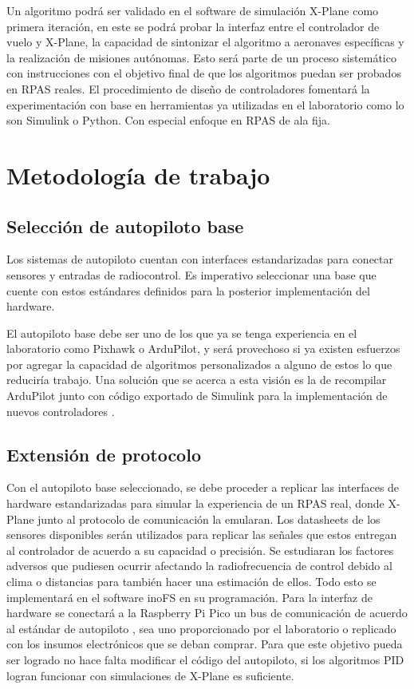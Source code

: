 Un algoritmo podrá ser validado en el software de simulación X-Plane como primera iteración, en este se podrá probar la interfaz entre el controlador de vuelo y X-Plane, la capacidad de sintonizar el algoritmo a aeronaves específicas y la realización de misiones autónomas. Esto será parte de un proceso sistemático con instrucciones con el objetivo final de que los algoritmos puedan ser probados en RPAS reales. El procedimiento de diseño de controladores fomentará la experimentación con base en herramientas ya utilizadas en el laboratorio como lo son Simulink o Python. Con especial enfoque en RPAS de ala fija.

\section{Metodología de trabajo}

\subsection{Selección de autopiloto base}

Los sistemas de autopiloto cuentan con interfaces estandarizadas para conectar sensores y entradas de radiocontrol. Es imperativo seleccionar una base que cuente con estos estándares definidos para la posterior implementación del hardware.

El autopiloto base debe ser uno de los que ya se tenga experiencia en el laboratorio como Pixhawk o ArduPilot, y será provechoso si ya existen esfuerzos por agregar la capacidad de algoritmos personalizados a alguno de estos lo que reduciría trabajo. Una solución que se acerca a esta visión es la de recompilar ArduPilot junto con código exportado de Simulink para la implementación de nuevos controladores \cite{ardupilot-custom}.

\subsection{Extensión de protocolo}

Con el autopiloto base seleccionado, se debe proceder a replicar las interfaces de hardware estandarizadas para simular la experiencia de un RPAS real, donde X-Plane junto al protocolo de comunicación la emularan. Los datasheets de los sensores disponibles serán utilizados para replicar las señales que estos entregan al controlador de acuerdo a su capacidad o precisión. Se estudiaran los factores adversos que pudiesen ocurrir afectando la radiofrecuencia de control debido al clima o distancias para también hacer una estimación de ellos. Todo esto se implementará en el software inoFS \cite{inofs} en su programación. Para la interfaz de hardware se conectará a la Raspberry Pi Pico un bus de comunicación de acuerdo al estándar de autopiloto \cite{px4-bus}, sea uno proporcionado por el laboratorio o replicado con los insumos electrónicos que se deban comprar. Para que este objetivo pueda ser logrado no hace falta modificar el código del autopiloto, si los algoritmos PID logran funcionar con simulaciones de X-Plane es suficiente.

